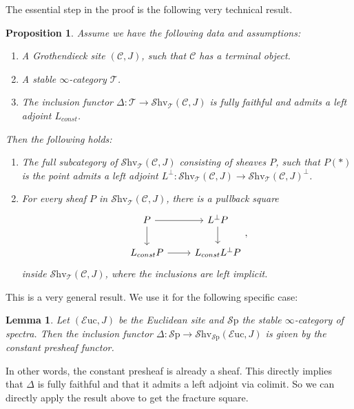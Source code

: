 \documentclass[10pt]{amsart}
\newcommand{\C}{\mathscr{C}}
\newcommand{\T}{\mathscr{T}}
\newcommand{\Sp}{\mathscr{S}\mathrm{p}}
\newcommand{\Euc}{\mathscr{E}\mathrm{uc}}
\newcommand{\Shv}{\mathscr{S}\mathrm{hv}}
\newtheorem{lemma}[equation]{Lemma}
\newtheorem{proposition}[equation]{Proposition}
\theoremstyle{definition}
\theoremstyle{remark}
\numberwithin{equation}{section}
\begin{document}
The essential step in the proof is the following very technical result.

\begin{proposition}
  Assume we have the following data and assumptions:
  \begin{enumerate}
    \item A Grothendieck site $(\C,J)$, such that $\C$ has a terminal object.
    \item A stable $\infty$-category $\T$.
    \item The inclusion functor $\Delta\colon \T \to \Shv_\T(\C,J)$ is fully faithful and admits a left adjoint $L_{const}$. 
  \end{enumerate}
  Then the following holds:
  \begin{enumerate}
    \item The full subcategory of $\Shv_\T(\C,J)$ consisting of sheaves $P$, such that $P(*)$ is the point admits a left adjoint $L^{\bot}\colon \Shv_\T(\C,J) \to \Shv_\T(\C,J)^\bot$.
    \item For every sheaf $P$ in $\Shv_\T(\C,J)$, there is a pullback square
    \[
    \begin{tikzcd}
      P \arrow[r] \arrow[d] & L^{\bot}P \arrow[d] \\
      L_{const}P \arrow[r] & L_{const}L^{\bot}P
    \end{tikzcd},
    \]
    inside $\Shv_\T(\C,J)$, where the inclusions are left implicit.
  \end{enumerate} 
\end{proposition}

This is a very general result. We use it for the following specific case:
\begin{lemma}
 Let $(\Euc,J)$ be the Euclidean site and $\Sp$ the stable $\infty$-category of spectra. Then the inclusion functor $\Delta\colon \Sp \to \Shv_{\Sp}(\Euc,J)$ is given by the constant presheaf functor.
\end{lemma}

In other words, the constant presheaf is already a sheaf. This directly implies that $\Delta$ is fully faithful and that it admits a left adjoint via colimit. So we can directly apply the result above to get the fracture square.
\end{document}
